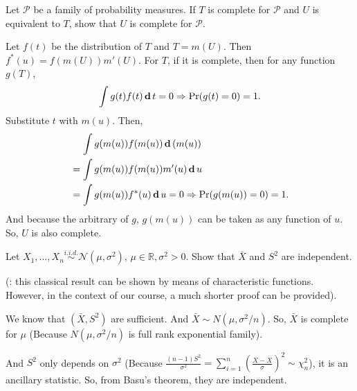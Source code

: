 \begin{exercise}
    Let \(\mathcal{P}\) be a family of probability measures. If \(T\) is complete for \(\mathcal{P}\) and \(U\) is equivalent to \(T\), show that \(U\) is complete for \(\mathcal{P}\). 
\end{exercise}

\begin{solution}
    Let $f(t)$ be the distribution of $T$ and $T=m(U)$. Then $f^*(u)=f(m(U))m'(U)$. For $T$, if it is complete, then for any function $g(T)$, 
    \[
        \int g(t)f(t)\,\mathbf{d}\, t=0 \Rightarrow \Pr(g(t)=0)=1. 
    \]
    Substitute $t$ with $m(u)$. Then, 
    \[
        \begin{aligned}
            &\quad\,\int g(m(u))f(m(u))\,\mathbf{d}\, (m(u))\\
            &=\int g(m(u))f(m(u))m'(u)\,\mathbf{d}\, u\\
            &=\int g(m(u))f^*(u)\,\mathbf{d}\, u=0\Rightarrow \Pr(g(m(u))=0)=1. 
        \end{aligned}
    \]
    And because the arbitrary of $g$, $g(m(u))$ can be taken as any function of $u$. So, $U$ is also complete. 
\end{solution}

\begin{exercise}
    Let \(X_{1}, \ldots, X_{n} \stackrel{i.i.d. }{\sim} \mathcal{N}\left(\mu, \sigma^{2}\right)\), \(\mu \in \mathbb{R}, \sigma^{2}>0 .\) Show that \(\bar{X}\) and \(S^{2}\) are independent. 
    
    (: this classical result can be shown by means of characteristic functions. However, in the context of our course, a much shorter proof can be provided). 
\end{exercise}

\begin{solution}
    We know that $(\bar{X}, S^2)$ are sufficient. And $\bar{X}\sim N(\mu,\sigma^2/n)$. So, $\bar{X}$ is complete for $\mu$ (Because $N(\mu,\sigma^2/n)$ is full rank exponential family). 
        
    And $S^2$ only depends on $\sigma^2$ (Because $\frac{(n-1)S^2}{\sigma^2}=\sum_{i=1}^n(\frac{X-\bar{X}}{\sigma})^2\sim\chi_n^2$), it is an ancillary statistic. So, from Basu's theorem, they are independent. 
\end{solution}

